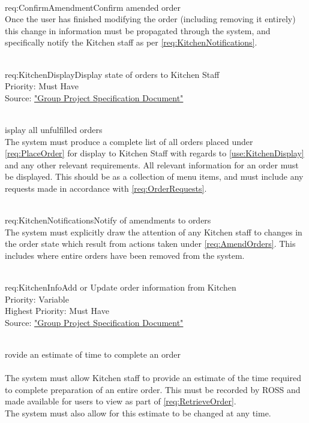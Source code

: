 \documentclass[11pt, a4paper]{report}
\def\itempar#1\\{\item \textbf{#1}\\} %
\begin{document}
\begin{enumerate}[label=F-UR-\arabic*, series=functional]
\begin{enumerate}[label*=.\arabic*]
\itempar \label{req:ConfirmAmendment}Confirm amended order\\
Once the user has finished modifying the order (including removing it entirely) this change in information must be propagated through the system, and specifically notify the Kitchen staff as per \autoref{req:KitchenNotifications}.
\end{enumerate}

\itempar \label{req:KitchenDisplay}Display state of orders to Kitchen Staff\\
Priority: Must Have\\
Source: \href{http://www.macs.hw.ac.uk/~rpp6/teaching/GroupProject/docs/project/GroupProjectSpec2017.pdf}{"Group Project Specification Document"}
\begin{enumerate}[label*=.\arabic*]
\itempar Display all unfulfilled orders\\
The system must produce a complete list of all orders placed under \autoref{req:PlaceOrder} for display to Kitchen Staff with regards to \autoref{use:KitchenDisplay} and any other relevant requirements.
All relevant information for an order must be displayed. This should be as a collection of menu items, and must include any requests made in accordance with \autoref{req:OrderRequests}.

\itempar \label{req:KitchenNotifications}Notify of amendments to orders\\
The system must explicitly draw the attention of any Kitchen staff to changes in the order state which result from actions taken under \autoref{req:AmendOrders}. This includes where entire orders have been removed from the system.
\end{enumerate}

\itempar \label{req:KitchenInfo}Add or Update order information from Kitchen\\
Priority: Variable\\
Highest Priority: Must Have\\
Source: \href{http://www.macs.hw.ac.uk/~rpp6/teaching/GroupProject/docs/project/GroupProjectSpec2017.pdf}{"Group Project Specification Document"}

\begin{enumerate}[label*=.\arabic*]
\itempar Provide an estimate of time to complete an order\\
\underline{}\\
The system must allow Kitchen staff to provide an estimate of the time required to complete preparation of an entire order. This must be recorded by ROSS and made available for users to view as part of \autoref{req:RetrieveOrder}.\\
The system must also allow for this estimate to be changed at any time.


\end{enumerate}
\end{enumerate}
\end{document}

